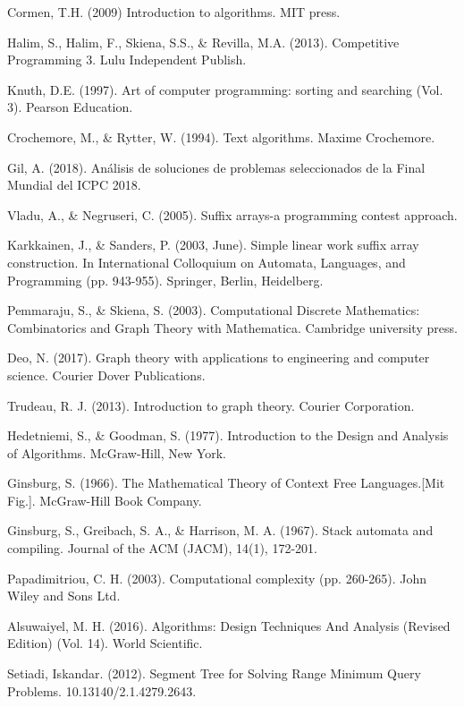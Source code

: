 \documentclass{report}
\begin{document}
\begin{thebibliography}{9}

Cormen, T.H. (2009) Introduction to algorithms. MIT press.

Halim, S., Halim, F., Skiena, S.S., \& Revilla, M.A. (2013). Competitive Programming 3. Lulu Independent Publish.

Knuth, D.E. (1997). Art of computer programming: sorting and searching (Vol. 3). Pearson Education.

Crochemore, M., \& Rytter, W. (1994). Text algorithms. Maxime Crochemore. 

Gil, A. (2018). An\'alisis de soluciones de problemas seleccionados de la Final Mundial del ICPC 2018.

Vladu, A., \& Negruseri, C. (2005). Suffix arrays-a programming contest approach.

Karkkainen, J., \& Sanders, P. (2003, June). Simple linear work suffix array construction. In International Colloquium on Automata, Languages, and Programming (pp. 943-955). Springer, Berlin, Heidelberg.

Pemmaraju, S., \& Skiena, S. (2003). Computational Discrete Mathematics: Combinatorics and Graph Theory with Mathematica. Cambridge university press.

Deo, N. (2017). Graph theory with applications to engineering and computer science. Courier Dover Publications.

Trudeau, R. J. (2013). Introduction to graph theory. Courier Corporation.

Hedetniemi, S., \& Goodman, S. (1977). Introduction to the Design and Analysis of Algorithms. McGraw-Hill, New York.

Ginsburg, S. (1966). The Mathematical Theory of Context Free Languages.[Mit Fig.]. McGraw-Hill Book Company.

Ginsburg, S., Greibach, S. A., \& Harrison, M. A. (1967). Stack automata and compiling. Journal of the ACM (JACM), 14(1), 172-201.

Papadimitriou, C. H. (2003). Computational complexity (pp. 260-265). John Wiley and Sons Ltd.

Alsuwaiyel, M. H. (2016). Algorithms: Design Techniques And Analysis (Revised Edition) (Vol. 14). World Scientific.

Setiadi, Iskandar. (2012). Segment Tree for Solving Range Minimum Query Problems. 10.13140/2.1.4279.2643.

\end{thebibliography}
\end{document}
